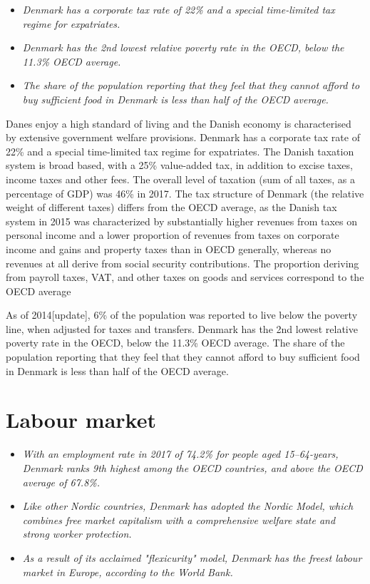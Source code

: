 \begin{itemize}
\item
  \emph{Denmark has a corporate tax rate of 22\% and a special
  time-limited tax regime for expatriates.}
\item
  \emph{Denmark has the 2nd lowest relative poverty rate in the OECD,
  below the 11.3\% OECD average.}
\item
  \emph{The share of the population reporting that they feel that they
  cannot afford to buy sufficient food in Denmark is less than half of
  the OECD average.}
\end{itemize}

Danes enjoy a high standard of living and the Danish economy is
characterised by extensive government welfare provisions. Denmark has a
corporate tax rate of 22\% and a special time-limited tax regime for
expatriates. The Danish taxation system is broad based, with a 25\%
value-added tax, in addition to excise taxes, income taxes and other
fees. The overall level of taxation (sum of all taxes, as a percentage
of GDP) was 46\% in 2017. The tax structure of Denmark (the relative
weight of different taxes) differs from the OECD average, as the Danish
tax system in 2015 was characterized by substantially higher revenues
from taxes on personal income and a lower proportion of revenues from
taxes on corporate income and gains and property taxes than in OECD
generally, whereas no revenues at all derive from social security
contributions. The proportion deriving from payroll taxes, VAT, and
other taxes on goods and services correspond to the OECD average

As of 2014{[}update{]}, 6\% of the population was reported to live below
the poverty line, when adjusted for taxes and transfers. Denmark has the
2nd lowest relative poverty rate in the OECD, below the 11.3\% OECD
average. The share of the population reporting that they feel that they
cannot afford to buy sufficient food in Denmark is less than half of the
OECD average.

\section{Labour market}\label{labour-market}

\begin{itemize}
\item
  \emph{With an employment rate in 2017 of 74.2\% for people aged
  15--64-years, Denmark ranks 9th highest among the OECD countries, and
  above the OECD average of 67.8\%.}
\item
  \emph{Like other Nordic countries, Denmark has adopted the Nordic
  Model, which combines free market capitalism with a comprehensive
  welfare state and strong worker protection.}
\item
  \emph{As a result of its acclaimed "flexicurity" model, Denmark has
  the freest labour market in Europe, according to the World Bank.}
\end{itemize}

